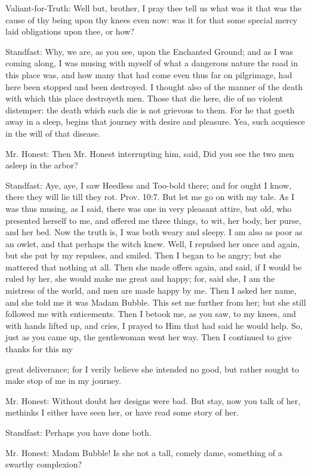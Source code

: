 Valiant-for-Truth: Well but, brother, I pray thee tell us what was it that was the cause of thy being upon thy knees even now: was it for that some special mercy laid obligations upon thee, or how?

Standfast: Why, we are, as you see, upon the Enchanted Ground; and as I was coming along, I was musing with myself of what a dangerous nature the road in this place was, and how many that had come even thus far on pilgrimage, had here been stopped and been destroyed. I thought also of the manner of the death with which this place destroyeth men. Those that die here, die of no violent distemper: the death which such die is not grievous to them. For he that goeth away in a sleep, begins that journey with desire and pleasure. Yea, such acquiesce in the will of that disease.

Mr. Honest: Then Mr. Honest interrupting him, said, Did you see the two men asleep in the arbor?

Standfast: Aye, aye, I saw Heedless and Too-bold there; and for ought I know, there they will lie till they rot. Prov. 10:7. But let me go on with my tale. As I was thus musing, as I said, there was one in very pleasant attire, but old, who presented herself to me, and offered me three things, to wit, her body, her purse, and her bed. Now the truth is, I was both weary and sleepy. I am also as poor as an owlet, and that perhaps the witch knew. Well, I repulsed her once and again, but she put by my repulses, and smiled. Then I began to be angry; but she mattered that nothing at all. Then she made offers again, and said, if I would be ruled by her, she would make me great and happy; for, said she, I am the mistress of the world, and men are made happy by me. Then I asked her name, and she told me it was Madam Bubble. This set me further from her; but she still followed me with enticements. Then I betook me, as you saw, to my knees, and with hands lifted up, and cries, I prayed to Him that had said he would help. So, just as you came up, the gentlewoman went her way. Then I continued to give thanks for this my

great deliverance; for I verily believe she intended no good, but rather sought to make stop of me in my journey.

Mr. Honest: Without doubt her designs were bad. But stay, now you talk of her, methinks I either have seen her, or have read some story of her.

Standfast: Perhaps you have done both.

Mr. Honest: Madam Bubble! Is she not a tall, comely dame, something of a swarthy complexion?

